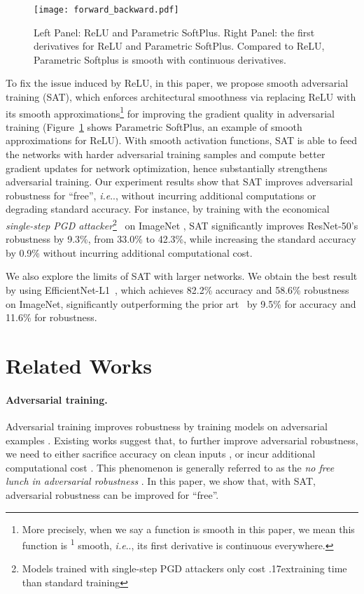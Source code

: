 \documentclass{article}
\makeatletter
\newcommand{\app}{\raise.17ex\hbox{}}
\DeclareRobustCommand\onedot{\futurelet\@let@token\@onedot}
\def\@onedot{\ifx\@let@token.\else.\null\fi\xspace}
\def\ie{\emph{i.e}\onedot} \def\Ie{\emph{I.e}\onedot}
\makeatother
\begin{document}
\begin{figure}[t!]
    \centering
    \texttt{[image: forward\_backward.pdf]}
    \vspace{-0.75em}
    \caption{Left Panel: ReLU and Parametric SoftPlus. Right Panel: the first derivatives for ReLU and Parametric SoftPlus. Compared to ReLU, Parametric Softplus is smooth with continuous derivatives.}
    \label{fig:forward_backward}
    \vspace{-1.35em}
\end{figure}


To fix the issue induced by ReLU, in this paper, we propose smooth adversarial training (SAT), which enforces architectural smoothness via replacing ReLU with its smooth approximations\footnote{More precisely, when we say a function is smooth in this paper, we mean this function is \textsuperscript{1} smooth, \ie, its first derivative is continuous everywhere.} for improving the gradient quality in adversarial training  (Figure~\ref{fig:forward_backward} shows Parametric SoftPlus, an example of smooth approximations for ReLU). With smooth activation functions, SAT is able to feed the networks with harder adversarial training samples and compute better gradient updates for network optimization, hence substantially strengthens adversarial training. 
Our experiment results show that SAT improves adversarial robustness for ``free'', \ie, without incurring additional computations or degrading standard accuracy. For instance, by training with the economical \emph{single-step PGD attacker}\footnote{Models trained with single-step PGD attackers only cost \app  training time than standard training}~\cite{Madry2018} on ImageNet \cite{Russakovsky2015}, SAT significantly improves ResNet-50's robustness by 9.3\%, from 33.0\% to 42.3\%, while increasing the standard accuracy by 0.9\% without incurring additional computational cost. 

We also explore the limits of SAT with larger networks. We obtain the best result by using EfficientNet-L1~\cite{Tan2019,Xie2019a}, which achieves 82.2\% accuracy and 58.6\% robustness on ImageNet, significantly outperforming the prior art~\cite{Qin2019} by 9.5\% for accuracy and 11.6\% for robustness. 


\section{Related Works}
\paragraph{Adversarial training.}
Adversarial training improves robustness by training models on adversarial examples \cite{Goodfellow2015,Kurakin2017,Madry2018}. Existing works suggest that, to further improve adversarial robustness, we need to either sacrifice accuracy on clean inputs \cite{wang2019a,wang2020,Zhang2019a,ding2020}, or incur additional computational cost \cite{Madry2018,xie2020intriguing}. This phenomenon is generally referred to as the \emph{no free lunch in adversarial robustness} \cite{Tsipras2018,Nakkiran2019,su2018robustness}. In this paper, we show that, with SAT, adversarial robustness can be improved for ``free''. 
\end{document}
